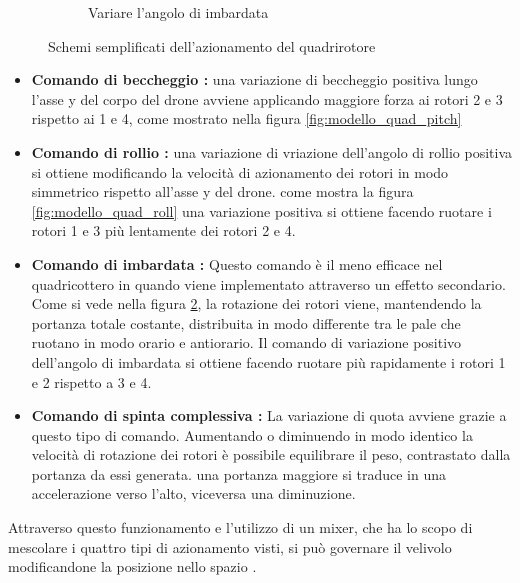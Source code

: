 \begin{figure}
\begin{subfigure}{0.45\textwidth}
		\caption{Variare l'angolo di imbardata}
		\label{fig:modello_quad_yaw}
	\end{subfigure}
	\caption{Schemi semplificati dell'azionamento del quadrirotore}
\end{figure}
\begin{itemize}
	\item \textbf{Comando di beccheggio : } una variazione di beccheggio positiva lungo l'asse y del corpo del drone avviene applicando maggiore forza ai rotori 2 e 3 rispetto ai 1 e 4, come mostrato nella figura \ref{fig:modello_quad_pitch}
	\item \textbf{Comando di rollio : } una variazione di vriazione dell'angolo di rollio positiva si ottiene modificando la velocità di azionamento dei rotori in modo simmetrico rispetto all'asse y del drone. come mostra la figura \ref{fig:modello_quad_roll} una variazione positiva si ottiene facendo ruotare i rotori 1 e 3 più lentamente dei rotori 2 e 4.
	\item \textbf{Comando di imbardata : } Questo comando è il meno efficace nel quadricottero in quando viene implementato attraverso un effetto secondario. Come si vede nella figura \ref{fig:modello_quad_yaw}, la rotazione dei rotori viene, mantendendo la portanza totale costante, distribuita in modo differente tra le pale che ruotano in modo orario e antiorario. Il comando di variazione positivo dell'angolo di imbardata si ottiene facendo ruotare più rapidamente i rotori 1 e 2 rispetto a 3 e 4.
	\item \textbf{Comando di spinta complessiva : } La variazione di quota avviene grazie a questo tipo di comando. Aumentando o diminuendo in modo identico la velocità di rotazione dei rotori è possibile equilibrare il peso, contrastato dalla portanza da essi generata. una portanza maggiore si traduce in una accelerazione verso l'alto, viceversa una diminuzione.
\end{itemize}
Attraverso questo funzionamento e l'utilizzo di un mixer, che ha lo scopo di mescolare i quattro tipi di azionamento visti, si può governare il velivolo modificandone la posizione nello spazio \cite{DesTestCarm}.
